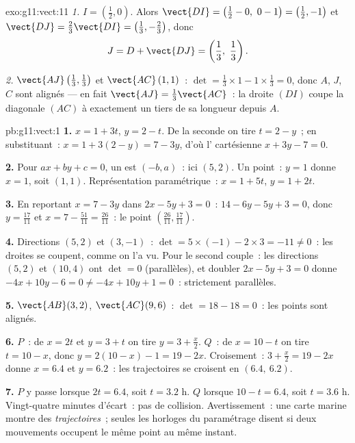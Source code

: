 \begin{solution}{exo:g11:vect:11}
\emph{1.} $I = \left(\frac12, 0\right)$. Alors
$\vect{DI} = \left(\frac12 - 0,\ 0 - 1\right) = \left(\frac12, -1\right)$
et $\vect{DJ} = \frac23\vect{DI} = \left(\frac13, -\frac23\right)$,
donc
\[
J = D + \vect{DJ} = \left(\frac13,\ \frac13\right).
\]

\emph{2.} $\vect{AJ}\left(\frac13, \frac13\right)$ et
$\vect{AC}\,(1, 1)$~:
$\det = \frac13 \times 1 - 1 \times \frac13 = 0$, donc $A$, $J$, $C$
sont alignés --- en fait $\vect{AJ} = \frac13\vect{AC}$~: la droite
$(DI)$ coupe la diagonale $(AC)$ à exactement un tiers de sa longueur
depuis $A$.
\end{solution}

\begin{solution}{pb:g11:vect:1}
\textbf{1.} $x = 1 + 3t$, $y = 2 - t$. De la seconde on tire
$t = 2 - y$~; en substituant~: $x = 1 + 3(2 - y) = 7 - 3y$, d'où
l' cartésienne $x + 3y - 7 = 0$.

\textbf{2.} Pour $ax + by + c = 0$, un  est
$(-b, a)$~: ici $(5, 2)$. Un point~: $y = 1$ donne $x = 1$, soit
$(1, 1)$. Représentation paramétrique~: $x = 1 + 5t$, $y = 1 + 2t$.

\textbf{3.} En reportant $x = 7 - 3y$ dans $2x - 5y + 3 = 0$~:
$14 - 6y - 5y + 3 = 0$, donc $y = \frac{17}{11}$ et
$x = 7 - \frac{51}{11} = \frac{26}{11}$~: le point
$\left(\frac{26}{11}, \frac{17}{11}\right)$.

\textbf{4.} Directions $(5, 2)$ et $(3, -1)$~:
$\det = 5 \times (-1) - 2 \times 3 = -11 \neq 0$~: les droites
se coupent, comme on l'a vu. Pour le second couple~: les directions
$(5, 2)$ et $(10, 4)$ ont $\det = 0$ (parallèles), et doubler
$2x - 5y + 3 = 0$ donne $-4x + 10y - 6 = 0 \neq -4x + 10y + 1
= 0$~: strictement parallèles.

\textbf{5.} $\vect{AB}(3, 2)$, $\vect{AC}(9, 6)$~:
$\det = 18 - 18 = 0$~: les points sont alignés.

\textbf{6.} $P$~: de $x = 2t$ et $y = 3 + t$ on tire
$y = 3 + \frac x2$. $Q$~: de $x = 10 - t$ on tire $t = 10 - x$,
donc $y = 2(10 - x) - 1 = 19 - 2x$. Croisement~:
$3 + \frac x2 = 19 - 2x$ donne $x = 6.4$ et $y = 6.2$~: les
trajectoires se croisent en $(6.4,\ 6.2)$.

\textbf{7.} $P$ y passe lorsque $2t = 6.4$, soit $t = 3.2$ h. $Q$
lorsque $10 - t = 6.4$, soit $t = 3.6$ h. Vingt-quatre minutes
d'écart~: pas de collision. Avertissement~: une carte marine montre
des \emph{trajectoires}~; seules les horloges du paramétrage disent
si deux mouvements occupent le même point au même instant.


\end{solution}
